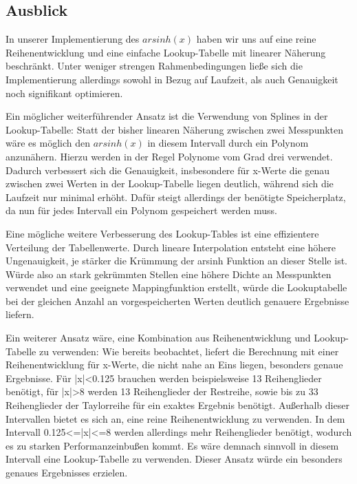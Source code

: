 \documentclass[course=erap] {aspdoc}
\begin{document}
    \subsection{Ausblick}

    In unserer Implementierung des $arsinh(x)$ haben wir uns auf eine reine Reihenentwicklung und eine einfache Lookup-Tabelle mit linearer Näherung beschränkt.
    Unter weniger strengen Rahmenbedingungen ließe sich die Implementierung allerdings sowohl in Bezug auf Laufzeit, als auch Genauigkeit noch signifikant optimieren.

    Ein möglicher weiterführender Ansatz ist die Verwendung von Splines in der Lookup-Tabelle:
    Statt der bisher linearen Näherung zwischen zwei Messpunkten wäre es möglich den $arsinh(x)$ in diesem Intervall durch ein Polynom anzunähern.
    Hierzu werden in der Regel Polynome vom Grad drei verwendet.~\cite{????}
    Dadurch verbessert sich die Genauigkeit, insbesondere für x-Werte die genau zwischen zwei Werten in der Lookup-Tabelle liegen deutlich, während sich die Laufzeit nur minimal erhöht.
    Dafür steigt allerdings der benötigte Speicherplatz, da nun für jedes Intervall ein Polynom gespeichert werden muss.

    Eine mögliche weitere Verbesserung des Lookup-Tables ist eine effizientere Verteilung der Tabellenwerte.
    Durch lineare Interpolation entsteht eine höhere Ungenauigkeit, je stärker die Krümmung der arsinh Funktion an dieser Stelle ist.
    Würde also an stark gekrümmten Stellen eine höhere Dichte an Messpunkten verwendet und eine geeignete Mappingfunktion erstellt, würde die Lookuptabelle bei der gleichen Anzahl an vorgespeicherten Werten deutlich genauere Ergebnisse liefern.

    Ein weiterer Ansatz wäre, eine Kombination aus Reihenentwicklung und Lookup-Tabelle zu verwenden:
    Wie bereits beobachtet, liefert die Berechnung mit einer Reihenentwicklung für x-Werte, die nicht nahe an Eins liegen, besonders genaue Ergebnisse.
    Für |x|<0.125 brauchen werden beispielsweise 13 Reihenglieder benötigt, für |x|>8 werden 13 Reihenglieder der Restreihe, sowie bis zu 33 Reihenglieder der Taylorreihe für ein exaktes Ergebnis benötigt.
    Außerhalb dieser Intervallen bietet es sich an, eine reine Reihenentwicklung zu verwenden.
    In dem Intervall 0.125<=|x|<=8 werden allerdings mehr Reihenglieder benötigt, wodurch es zu starken Performanzeinbußen kommt.
    Es wäre demnach sinnvoll in diesem Intervall eine Lookup-Tabelle zu verwenden.
    Dieser Ansatz würde ein besonders genaues Ergebnisses erzielen.
\end{document}
